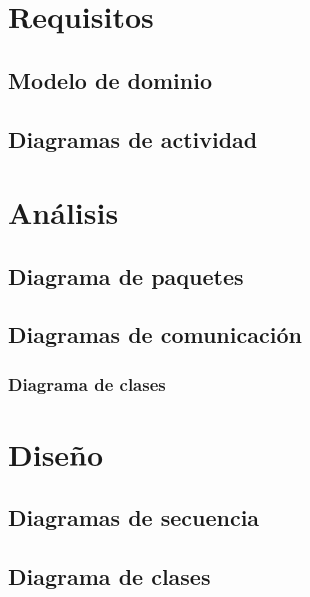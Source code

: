 \documentclass[11pt, a4paper, twoside, titlepage]{article}
\begin{document}
	\section{Requisitos}
		\subsection{Modelo de dominio}

		\subsection{Diagramas de actividad}

	\newpage
	
	\section{Análisis}
		\subsection{Diagrama de paquetes}
		\subsection{Diagramas de comunicación}
		\subsubsection{Diagrama de clases}
	\newpage

	\section{Diseño}
		\subsection{Diagramas de secuencia}
		\subsection{Diagrama de clases}
\end{document}
